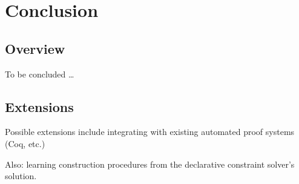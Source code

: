 \chapter{Conclusion}
\label{chap:conclusion}

\section{Overview}

To be concluded \ldots

\section{Extensions}

Possible extensions include integrating with existing automated proof
systems (Coq, etc.)

Also: learning construction procedures from the declarative constraint
solver's solution.
